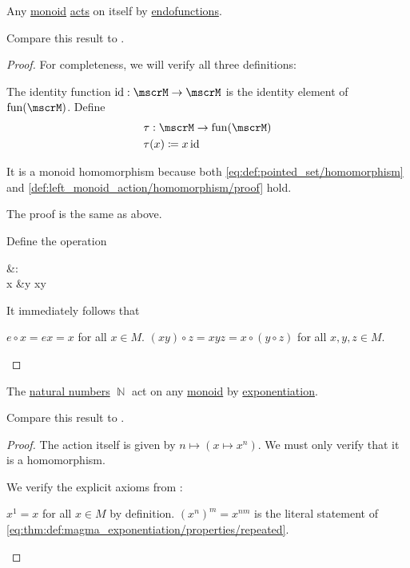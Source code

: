 \begin{proposition}\label{thm:monoid_is_action}
  Any \hyperref[def:unital_magma/associative]{monoid} \hyperref[def:left_monoid_action]{acts} on itself by \hyperref[def:multi_valued_function/endofunction]{endofunctions}.

  Compare this result to .
\end{proposition}
\begin{proof}
  For completeness, we will verify all three definitions:

   The identity function \( \id: \mscrM \to \mscrM \) is the identity element of \( \fun(\mscrM) \). Define
  \begin{align*}
    &\tau: \mscrM \to \fun(\mscrM) \\
    &\tau(x) \coloneqq x \id
  \end{align*}

  It is a monoid homomorphism because both \eqref{eq:def:pointed_set/homomorphism} and \eqref{def:left_monoid_action/homomorphism/proof} hold.

   The proof is the same as above.

   Define the operation
  \begin{balign*}
    {}&\odot{}: \mscrM \times \mscrM \to \mscrM \\
    x &\odot y \coloneqq xy
  \end{balign*}

  It immediately follows that
  \begin{refenum}
     \( e \circ x = ex = x \) for all \( x \in M \).
     \( (x y) \circ z = xyz = x \circ (y \circ z) \) for all \( x, y, z \in M \).
  \end{refenum}
\end{proof}

\begin{proposition}\label{thm:natural_numbers_monoid_action}
  The \hyperref[def:set_of_natural_numbers]{natural numbers} \( \BbbN \) act on any \hyperref[def:unital_magma/associative]{monoid} by \hyperref[def:unital_magma/exponentiation]{exponentiation}.

  Compare this result to .
\end{proposition}
\begin{proof}
  The action itself is given by \( n \mapsto (x \mapsto x^n) \). We must only verify that it is a homomorphism.

  We verify the explicit axioms from :
  \begin{refenum}
     \( x^1 = x \) for all \( x \in M \) by definition.
     \( (x^n)^m = x^{nm} \) is the literal statement of \eqref{eq:thm:def:magma_exponentiation/properties/repeated}.
  \end{refenum}
\end{proof}
